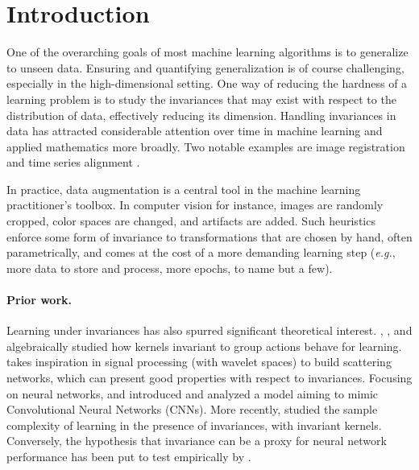 \newcommand{\Diffy}{Diffy\xspace}



\section{Introduction}
One of the overarching goals of most machine learning algorithms is to generalize to unseen data. Ensuring and quantifying generalization is of course challenging, especially in the high-dimensional setting. One way of reducing the hardness of a learning problem is to study the invariances that may exist with respect to the distribution of data, effectively reducing its dimension. Handling invariances in data has attracted considerable attention over time in machine learning and applied mathematics more broadly. Two notable examples are image registration \citep{registration1,registration2} and time series alignment \citep{dtw,soft-dtw,vayer,diff-dtw,align-incomparable}.

In practice, data augmentation is a central tool in the machine learning practitioner's toolbox. In computer vision for instance, images are randomly cropped, color spaces are changed, and artifacts are added. Such heuristics enforce some form of invariance to transformations that are chosen by hand, often parametrically, and comes at the cost of a more demanding learning step (\emph{e.g.}, more data to store and process, more epochs, to name but a few).
\paragraph{Prior work.}
Learning under invariances has also spurred significant theoretical interest.
\citet{decoste2002training}, \citet{haasdonk2007invariant}, \citet{kondor2008group} and \citet{mroueh2015} algebraically studied how kernels invariant to group actions behave for learning. \citet{bruna2013invariant} takes inspiration in signal processing (with wavelet spaces) to build scattering networks, which can present good properties with respect to invariances. Focusing on neural networks, \citet{CKN} and \citet{CKNInvariance} introduced and analyzed a model aiming to mimic Convolutional Neural Networks (CNNs). More recently, \citet{bietti2021} studied the sample complexity of learning in the presence of invariances, with invariant kernels. Conversely, the hypothesis that invariance can be a proxy for neural network performance has been put to test empirically by \citet{wyartdiffeo}.


